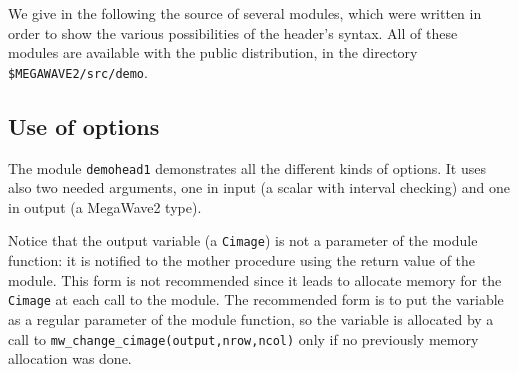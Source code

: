 We give in the following the source of several modules, which were written in 
order to show the various possibilities of the header's syntax.
All of these modules are available with the public distribution, in the
directory \verb+$MEGAWAVE2/src/demo+.

\subsection{Use of options}
\label{header_examples_options}

The module \verb+demohead1+ demonstrates all the different kinds of options.
It uses also two needed arguments, one in input (a scalar with interval 
checking) and one in output (a MegaWave2 type).

Notice that the output variable (a \verb+Cimage+) is not a parameter of
the module function: it is notified to the mother procedure using the
return value of the module.
This form is not recommended since it leads to allocate memory for the
\verb+Cimage+ at each call to the module.
The recommended form is to put the variable as a regular parameter of
the module function, so the variable is allocated by a call to \verb+mw_change_cimage(output,nrow,ncol)+ only if no previously memory allocation was done. 

